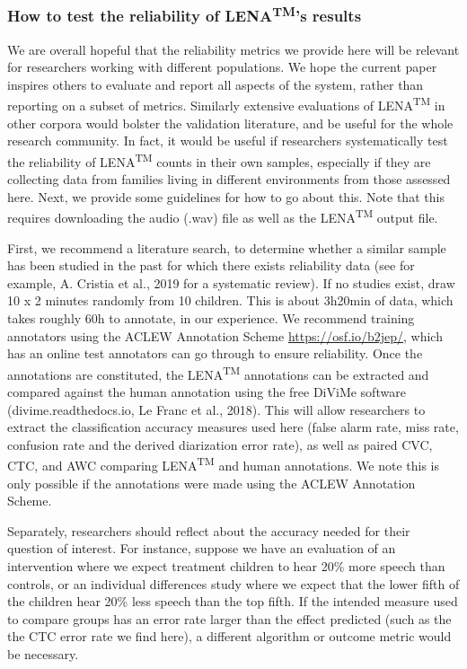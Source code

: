 \documentclass[english,floatsintext,man]{apa6}
\begin{document}
\subsubsection{\texorpdfstring{How to test the reliability of
LENA\textsuperscript{TM}'s
results}{How to test the reliability of LENATM's results}}\label{how-to-test-the-reliability-of-lenatms-results}

We are overall hopeful that the reliability metrics we provide here will
be relevant for researchers working with different populations. We hope
the current paper inspires others to evaluate and report all aspects of
the system, rather than reporting on a subset of metrics. Similarly
extensive evaluations of LENA\textsuperscript{TM} in other corpora would
bolster the validation literature, and be useful for the whole research
community. In fact, it would be useful if researchers systematically
test the reliability of LENA\textsuperscript{TM} counts in their own
samples, especially if they are collecting data from families living in
different environments from those assessed here. Next, we provide some
guidelines for how to go about this. Note that this requires downloading
the audio (.wav) file as well as the LENA\textsuperscript{TM} output
file.

First, we recommend a literature search, to determine whether a similar
sample has been studied in the past for which there exists reliability
data (see for example, A. Cristia et al., 2019 for a systematic review).
If no studies exist, draw 10 x 2 minutes randomly from 10 children. This
is about 3h20min of data, which takes roughly 60h to annotate, in our
experience. We recommend training annotators using the ACLEW Annotation
Scheme \url{https://osf.io/b2jep/}, which has an online test annotators
can go through to ensure reliability. Once the annotations are
constituted, the LENA\textsuperscript{TM} annotations can be extracted
and compared against the human annotation using the free DiViMe software
(divime.readthedocs.io, Le Franc et al., 2018). This will allow
researchers to extract the classification accuracy measures used here
(false alarm rate, miss rate, confusion rate and the derived diarization
error rate), as well as paired CVC, CTC, and AWC comparing
LENA\textsuperscript{TM} and human annotations. We note this is only
possible if the annotations were made using the ACLEW Annotation Scheme.

Separately, researchers should reflect about the accuracy needed for
their question of interest. For instance, suppose we have an evaluation
of an intervention where we expect treatment children to hear 20\% more
speech than controls, or an individual differences study where we expect
that the lower fifth of the children hear 20\% less speech than the top
fifth. If the intended measure used to compare groups has an error rate
larger than the effect predicted (such as the the CTC error rate we find
here), a different algorithm or outcome metric would be necessary.
\end{document}
